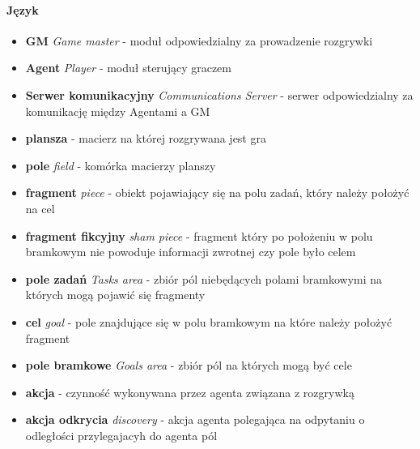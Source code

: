 \documentclass[Dokumentacja.tex]{subfiles}
\begin{document}
\paragraph{Język}
\begin{itemize}
    \item \textbf{GM} \textit{Game master} - moduł odpowiedzialny za prowadzenie rozgrywki
    \item \textbf{Agent} \textit{Player} - moduł sterujący graczem
    \item \textbf{Serwer komunikacyjny} \textit{Communications Server} - serwer odpowiedzialny za komunikację między Agentami a GM
    \item \textbf{plansza} - macierz na której rozgrywana jest gra
    \item \textbf{pole} \textit{field} - komórka macierzy planszy
    \item \textbf{fragment} \textit{piece} - obiekt pojawiający się na polu zadań, który należy położyć na cel
    \item \textbf{fragment fikcyjny} \textit{sham piece} - fragment który po położeniu w polu bramkowym nie powoduje informacji zwrotnej czy pole było celem
    \item \textbf{pole zadań} \textit{Tasks area} - zbiór pól niebędących polami bramkowymi na których mogą pojawić się fragmenty
    \item \textbf{cel} \textit{goal} - pole znajdujące się w polu bramkowym na które należy położyć fragment
    \item \textbf{pole bramkowe} \textit{Goals area} - zbiór pól na których mogą być cele
    \item \textbf{akcja} - czynność wykonywana przez agenta związana z rozgrywką
    \item \textbf{akcja odkrycia} \textit{discovery} - akcja agenta polegająca na odpytaniu o odległości przylegajacyh do agenta pól
\end{itemize}
\end{document}
